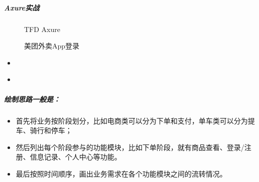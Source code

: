 \documentclass[letterpaper,10pt,english]{sphinxmanual}
\begin{document}
\subparagraph{Axure实战}
\label{\detokenize{chapter_knowledge/flow_chart:axure}}
\begin{figure}[H]
\centering
\capstart

\noindent{}
\caption{TFD
Axure\sphinxfootnotemark[584]}\label{\detokenize{chapter_knowledge/flow_chart:id40}}\end{figure}
%
\begin{footnotetext}[584]\sphinxAtStartFootnote
{}
%
\end{footnotetext}\ignorespaces 
\begin{figure}[H]
\centering
\capstart

\noindent{}
\caption{美团外卖App登录}\label{\detokenize{chapter_knowledge/flow_chart:id41}}\end{figure}
\begin{itemize}
\item {} 
%
\begin{footnote}[585]\sphinxAtStartFootnote
{}
%
\end{footnote}

\item {} 
%
\begin{footnote}[586]\sphinxAtStartFootnote
{}
%
\end{footnote}

\end{itemize}


\subparagraph{绘制思路一般是：}
\label{\detokenize{chapter_knowledge/flow_chart:id9}}\begin{itemize}
\item {} 
首先将业务按阶段划分，比如电商类可以分为下单和支付，单车类可以分为提车、骑行和停车；

\item {} 
然后列出每个阶段参与的功能模块，比如下单阶段，就有商品查看、登录/注册、信息记录、个人中心等功能。

\item {} 
最后按照时间顺序，画出业务需求在各个功能模块之间的流转情况。

\end{itemize}
\end{document}
